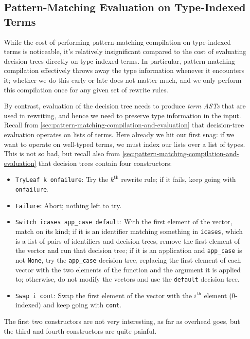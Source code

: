 \subsection{Pattern-Matching Evaluation on Type-Indexed Terms}\label{sec:rewriting-more:AST:type-indexed-pattern-matching}
While the cost of performing pattern-matching compilation on type-indexed terms is noticeable, it's relatively insignificant compared to the cost of evaluating decision trees directly on type-indexed terms.
In particular, pattern-matching compilation effectively throws away the type information whenever it encounters it; whether we do this early or late does not matter much, and we only perform this compilation once for any given set of rewrite rules.

By contrast, evaluation of the decision tree needs to produce \emph{term ASTs} that are used in rewriting, and hence we need to preserve type information in the input.
Recall from \autoref{sec:pattern-matching-compilation-and-evaluation} that decision-tree evaluation operates on lists of terms.
Here already we hit our first snag: if we want to operate on well-typed terms, we must index our lists over a list of types.
This is not so bad, but recall also from \autoref{sec:pattern-matching-compilation-and-evaluation} that decision trees contain four constructors:
\begin{itemize}
  \item \texttt{TryLeaf k onfailure}: Try the $k^\text{th}$ rewrite rule; if it fails, keep going with \texttt{onfailure}.
  \item \texttt{Failure}: Abort; nothing left to try.
  \item \texttt{Switch icases app\_case default}:
    With the first element of the vector, match on its kind; if it is an identifier matching something in \texttt{icases}, which is a list of pairs of identifiers and decision trees, remove the first element of the vector and run that decision tree; if it is an application and \texttt{app\_case} is not \texttt{None}, try the \texttt{app\_case} decision tree, replacing the first element of each vector with the two elements of the function and the argument it is applied to; otherwise, do not modify the vectors and use the \texttt{default} decision tree.
  \item \texttt{Swap i cont}: Swap the first element of the vector with the $i^\texttt{th}$ element (0-indexed) and keep going with \texttt{cont}.
\end{itemize}
The first two constructors are not very interesting, as far as overhead goes, but the third and fourth constructors are quite painful.

